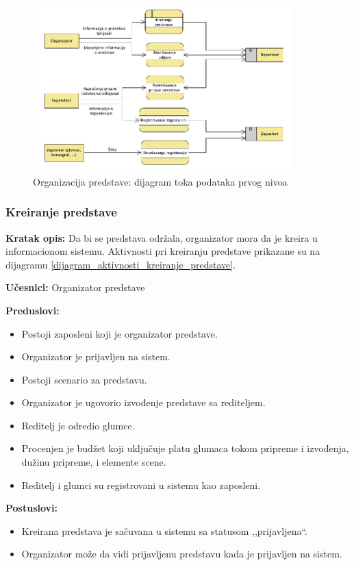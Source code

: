 \documentclass[a4paper]{article}
\begin{document}
\begin{figure}[H]
  \begin{center}
      \includegraphics[width=100mm]{../images/dfd2_organizacija_predstave.png}
  \end{center}
  \caption{Organizacija predstave: dijagram toka podataka prvog nivoa}
  \label{dfd2_organizacija_predstave}
\end{figure}

\subsubsection{Kreiranje predstave} \label{Kreiranje predstave}
\noindent\textbf{Kratak opis:} Da bi se predstava održala, organizator mora da je kreira u informacionom sistemu. Aktivnosti pri kreiranju predstave prikazane su na dijagramu \ref{dijagram_aktivnosti_kreiranje_predstave}.

\noindent\textbf{Učesnici:} Organizator predstave

\noindent\textbf{Preduslovi:}
  \begin{itemize}
    \item Postoji zaposleni koji je organizator predstave.
    \item Organizator je prijavljen na sistem.
    \item Postoji scenario za predstavu.
    \item Organizator je ugovorio izvođenje predstave sa rediteljem.
    \item Reditelj je odredio glumce.
    \item Procenjen je budžet koji uključuje platu glumaca tokom pripreme i izvođenja, dužinu pripreme, i elemente scene.
    \item Reditelj i glumci su registrovani u sistemu kao zaposleni.
  \end{itemize}

\noindent\textbf{Postuslovi:} 
  \begin{itemize}
    \item Kreirana predstava je sačuvana u sistemu sa statusom ,,prijavljena``.
    \item Organizator može da vidi prijavljenu predstavu kada je prijavljen na sistem.
  \end{itemize}
\end{document}
